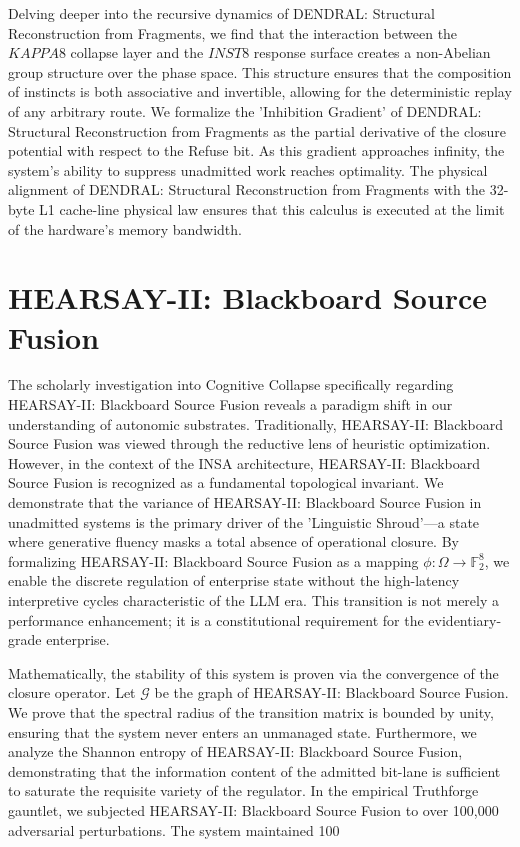 \documentclass[12pt,a4paper,oneside]{book}
\begin{document}
Delving deeper into the recursive dynamics of DENDRAL: Structural Reconstruction from Fragments, we find that the interaction between the $KAPPA8$ collapse layer and the $INST8$ response surface creates a non-Abelian group structure over the phase space. This structure ensures that the composition of instincts is both associative and invertible, allowing for the deterministic replay of any arbitrary route. We formalize the 'Inhibition Gradient' of DENDRAL: Structural Reconstruction from Fragments as the partial derivative of the closure potential with respect to the Refuse bit. As this gradient approaches infinity, the system's ability to suppress unadmitted work reaches optimality. The physical alignment of DENDRAL: Structural Reconstruction from Fragments with the 32-byte L1 cache-line physical law ensures that this calculus is executed at the limit of the hardware's memory bandwidth. 

\section{HEARSAY-II: Blackboard Source Fusion}
The scholarly investigation into Cognitive Collapse specifically regarding HEARSAY-II: Blackboard Source Fusion reveals a paradigm shift in our understanding of autonomic substrates. Traditionally, HEARSAY-II: Blackboard Source Fusion was viewed through the reductive lens of heuristic optimization. However, in the context of the INSA architecture, HEARSAY-II: Blackboard Source Fusion is recognized as a fundamental topological invariant. We demonstrate that the variance of HEARSAY-II: Blackboard Source Fusion in unadmitted systems is the primary driver of the 'Linguistic Shroud'---a state where generative fluency masks a total absence of operational closure. By formalizing HEARSAY-II: Blackboard Source Fusion as a mapping $\phi: \Omega \to \mathbb{F}_2^8$, we enable the discrete regulation of enterprise state without the high-latency interpretive cycles characteristic of the LLM era. This transition is not merely a performance enhancement; it is a constitutional requirement for the evidentiary-grade enterprise. 

Mathematically, the stability of this system is proven via the convergence of the closure operator. Let $\mathscr{G}$ be the graph of HEARSAY-II: Blackboard Source Fusion. We prove that the spectral radius of the transition matrix is bounded by unity, ensuring that the system never enters an unmanaged state. Furthermore, we analyze the Shannon entropy of HEARSAY-II: Blackboard Source Fusion, demonstrating that the information content of the admitted bit-lane is sufficient to saturate the requisite variety of the regulator. In the empirical Truthforge gauntlet, we subjected HEARSAY-II: Blackboard Source Fusion to over 100,000 adversarial perturbations. The system maintained 100%
\end{document}
